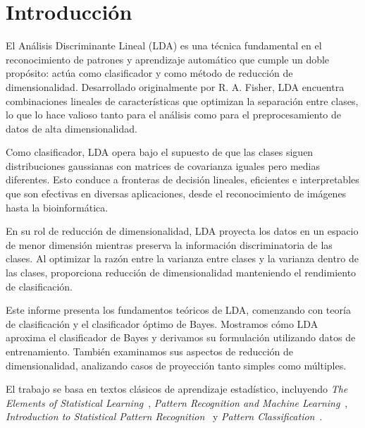 \section{Introducción}

El Análisis Discriminante Lineal (LDA) es una técnica fundamental en el reconocimiento de patrones y aprendizaje automático que cumple un doble propósito: actúa como clasificador y como método de reducción de dimensionalidad. Desarrollado originalmente por R. A. Fisher, LDA encuentra combinaciones lineales de características que optimizan la separación entre clases, lo que lo hace valioso tanto para el análisis como para el preprocesamiento de datos de alta dimensionalidad.

Como clasificador, LDA opera bajo el supuesto de que las clases siguen distribuciones gaussianas con matrices de covarianza iguales pero medias diferentes. Esto conduce a fronteras de decisión lineales, eficientes e interpretables que son efectivas en diversas aplicaciones, desde el reconocimiento de imágenes hasta la bioinformática.

En su rol de reducción de dimensionalidad, LDA proyecta los datos en un espacio de menor dimensión mientras preserva la información discriminatoria de las clases. Al optimizar la razón entre la varianza entre clases y la varianza dentro de las clases, proporciona reducción de dimensionalidad manteniendo el rendimiento de clasificación.

Este informe presenta los fundamentos teóricos de LDA, comenzando con teoría de clasificación y el clasificador óptimo de Bayes. Mostramos cómo LDA aproxima el clasificador de Bayes y derivamos su formulación utilizando datos de entrenamiento. También examinamos sus aspectos de reducción de dimensionalidad, analizando casos de proyección tanto simples como múltiples.

El trabajo se basa en textos clásicos de aprendizaje estadístico, incluyendo \emph{The Elements of Statistical Learning}~\cite{hastie2009elements}, \emph{Pattern Recognition and Machine Learning}~\cite{bishop2006pattern}, \emph{Introduction to Statistical Pattern Recognition}~\cite{fukunaga1990introduction} y \emph{Pattern Classification}~\cite{duda2012pattern}.

